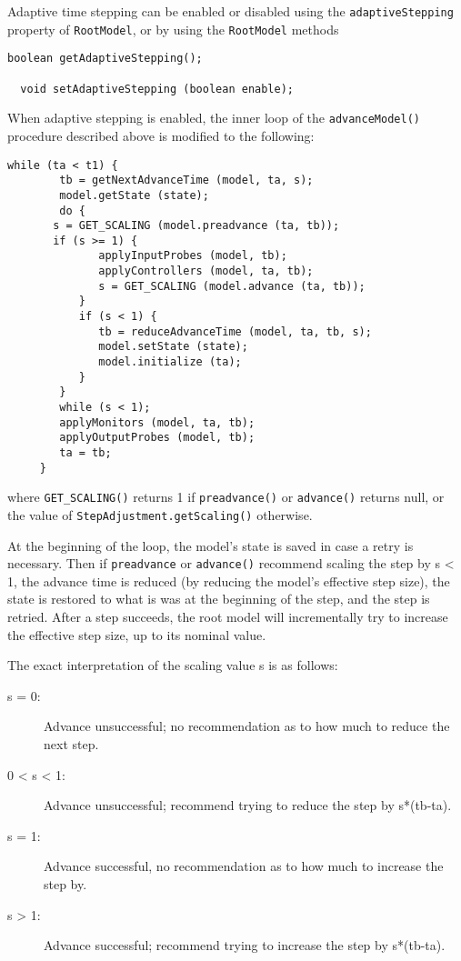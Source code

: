 \documentclass{article}
\begin{document}
Adaptive time stepping can be enabled or disabled using the {\tt adaptiveStepping}
property of {\tt RootModel}, or by using the {\tt RootModel} methods
\begin{lstlisting}[]
  boolean getAdaptiveStepping();

  void setAdaptiveStepping (boolean enable);
\end{lstlisting}

When adaptive stepping is enabled, the inner loop of the
{\tt advanceModel()} procedure described above is modified to the following:
\begin{lstlisting}[]
     while (ta < t1) {
        tb = getNextAdvanceTime (model, ta, s);
        model.getState (state);
        do {
	   s = GET_SCALING (model.preadvance (ta, tb));
	   if (s >= 1) {
              applyInputProbes (model, tb);
              applyControllers (model, ta, tb);
              s = GET_SCALING (model.advance (ta, tb));
           }
           if (s < 1) {
              tb = reduceAdvanceTime (model, ta, tb, s);
              model.setState (state);
              model.initialize (ta);
           }
        }
        while (s < 1);
        applyMonitors (model, ta, tb);
        applyOutputProbes (model, tb);
        ta = tb;
     }
\end{lstlisting}
where {\tt GET\_SCALING()} returns 1 if {\tt preadvance()} or
{\tt advance()} returns null, or the value of 
{\tt StepAdjustment.getScaling()} otherwise.

At the beginning of the loop, the model's state is saved in case a
retry is necessary. Then if {\tt preadvance{}} or {\tt advance()} recommend
scaling the step by s < 1, the advance time is
reduced (by reducing the model's effective step size), the state is
restored to what is was at the beginning of the step, and the step is
retried. After a step succeeds, the root model will
incrementally try to increase the effective step size, up to its
nominal value.

The exact interpretation of the scaling value s is
as follows:

\begin{description}
\item[s = 0:]
Advance unsuccessful; no recommendation as to how much to reduce the 
next step.

\item[0 < s < 1:]
Advance unsuccessful; recommend trying to reduce the step by s*(tb-ta).

\item[s = 1:]
Advance successful, no recommendation as to how much to increase the step by.

\item[s > 1:]
Advance successful; recommend trying to increase the step by s*(tb-ta).
\end{description}
\end{document}
